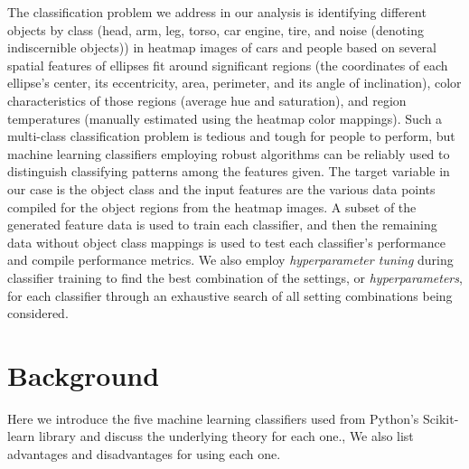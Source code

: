 \documentclass[journal,twocolumn,12pt,twoside]{IEEEtran}
\begin{document}
\par The classification problem we address in our analysis is identifying different objects by class (head, arm, leg, torso, car engine, tire, and noise (denoting indiscernible objects)) in heatmap images of cars and people based on several spatial features of ellipses fit around significant regions (the coordinates of each ellipse's center, its eccentricity, area, perimeter, and its angle of inclination), color characteristics of those regions (average hue and saturation), and region temperatures (manually estimated using the heatmap color mappings). Such a multi-class classification problem is tedious and tough for people to perform, but machine learning classifiers employing robust algorithms can be reliably used to distinguish classifying patterns among the features given. The target variable in our case is the object class and the input features are the various data points compiled for the object regions from the heatmap images. A subset of the generated feature data is used to train each classifier, and then the remaining data without object class mappings is used to test each classifier's performance and compile performance metrics. We also employ \textit{hyperparameter tuning} during classifier training to find the best combination of the settings, or \textit{hyperparameters}, for each classifier through an exhaustive search of all setting combinations being considered.

\section{Background}
Here we introduce the five machine learning classifiers used from Python's Scikit-learn library and discuss the underlying theory for each one., We also list advantages and disadvantages for using each one.
\end{document}
